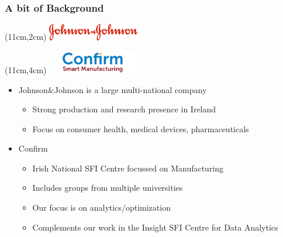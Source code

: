 
\begin{frame}
\frametitle{A bit of Background}
\begin{textblock*}{4cm}(11cm,2cm)
\includegraphics[width=4cm]{imagesjj/1000px-Johnson_and_Johnson_Logo.png}
\end{textblock*}
\begin{textblock*}{4cm}(11cm,4cm)
\includegraphics[width=4cm]{imagesjj/confirm.png}
\end{textblock*}
\begin{itemize}
\item Johnson\&Johnson is a large multi-national company
\begin{itemize}
\item Strong production and research presence in Ireland
\item Focus on consumer health, medical devices, pharmaceuticals
\end{itemize}
\item Confirm
\begin{itemize}
\item Irish National SFI Centre focussed on Manufacturing
\item Includes groups from multiple universities
\item Our focus is on analytics/optimization
\item Complements our work in the Insight SFI Centre for Data Analytics
\end{itemize}
\end{itemize}
\end{frame}

